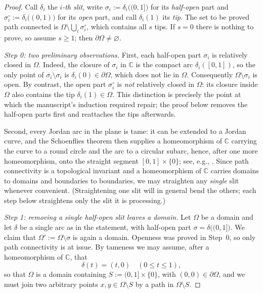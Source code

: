 \documentclass[11pt,reqno]{amsart}
\theoremstyle{definition}
\theoremstyle{remark}
\newcommand{\C}{\mathbb C}
\begin{document}
\begin{proof}
Call $\delta_i$ the \emph{$i$-th slit}, write
$\sigma_i:=\delta_i\bigl((0,1]\bigr)$ for its \emph{half-open} part and
$\sigma_i^{\circ}:=\delta_i\bigl((0,1)\bigr)$ for its \emph{open} part, and call
$\delta_i(1)$ its \emph{tip}. The set to be proved path connected is
$\Omega\setminus\bigcup_i\sigma_i^{\circ}$, which contains all $s$ tips. If $s=0$ there
is nothing to prove, so assume $s\ge1$; then $\partial\Omega\neq\varnothing$.

\emph{Step 0: two preliminary observations.}
First, each half-open part $\sigma_i$ is relatively closed in $\Omega$. Indeed, the
closure of $\sigma_i$ in $\C$ is the compact arc $\delta_i([0,1])$, so the only point of
$\overline{\sigma_i}\setminus\sigma_i$ is $\delta_i(0)\in\partial\Omega$, which does not
lie in $\Omega$. Consequently $\Omega\setminus\sigma_i$ is open. By contrast, the open
part $\sigma_i^{\circ}$ is \emph{not} relatively closed in $\Omega$: its closure inside
$\Omega$ also contains the tip $\delta_i(1)\in\Omega$. This distinction is precisely the
point at which the manuscript's induction required repair; the proof below removes the
half-open parts first and reattaches the tips afterwards.

Second, every Jordan arc in the plane is tame: it can be extended to a Jordan curve,
and the Schoenflies theorem then supplies a homeomorphism of $\C$ carrying the curve to
a round circle and the arc to a circular subarc, hence, after one more homeomorphism,
onto the straight segment $[0,1]\times\{0\}$; see, e.g.,
\cite{New51,Why42}. Since path connectivity is a topological invariant and a
homeomorphism of $\C$ carries domains to domains and boundaries to boundaries, we may
straighten any \emph{single} slit whenever convenient. (Straightening one slit will in
general bend the others; each step below straightens only the slit it is processing.)

\emph{Step 1: removing a single half-open slit leaves a domain.}
Let $\Omega$ be a domain and let $\delta$ be a single arc as in the statement, with
half-open part $\sigma=\delta\bigl((0,1]\bigr)$. We claim that
$\Omega':=\Omega\setminus\sigma$ is again a domain. Openness was proved in Step~0, so
only path connectivity is at issue. By tameness we may assume, after a homeomorphism of
$\C$, that
\[
\delta(t)=(t,0)\quad(0\le t\le1),
\]
so that $\Omega$ is a domain containing $S:=(0,1]\times\{0\}$, with
$(0,0)\in\partial\Omega$, and we must join two arbitrary points
$x,y\in\Omega\setminus S$ by a path in $\Omega\setminus S$.


\end{proof}
\end{document}
